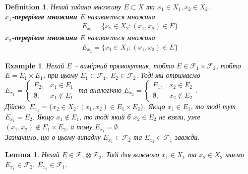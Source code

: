 \documentclass[a4paper, 10pt]{article}
\theoremstyle{theoremdd}
\newtheorem{definition}[theorem]{Definition}
\newtheorem{example}[theorem]{Example}
\newtheorem{lemma}[theorem]{Lemma}
\begin{document}
\begin{definition}
Нехай задано множину $E \subset X$ та $x_1 \in X_1, x_2 \in X_2$.\\
\textbf{$x_1$-перерізом множини $E$} називається множина
\begin{align*}
E_{x_1} = \{x_2 \in X_2 : (x_1,x_2) \in E\}
\end{align*}
\textbf{$x_2$-перерізом множини $E$} називається множина
\begin{align*}
E_{x_2} = \{x_1 \in X_1 : (x_1,x_2) \in E\}
\end{align*}
\end{definition}

\begin{example}
\label{measurable_rectangle_and_its_sections}
Нехай $E$ -- вимірний прямокутник, тобто $E \in \mathcal{F}_1 \times \mathcal{F}_2$, тобто $E = E_1 \times E_1$, при цьому $E_1 \in \mathcal{F}_1,\ E_2 \in \mathcal{F}_2$. Тоді ми отримаємо $E_{x_1} = \begin{cases} E_2, & x_1 \in E_1 \\ \emptyset, & x_1 \notin E_1 \end{cases}$ та аналогічно $E_{x_2} = \begin{cases} E_1, & x_2 \in E_2 \\ \emptyset, & x_2 \notin E_2 \end{cases}$.\\
Дійсно, $E_{x_1} = \{x_2 \in X_2 : (x_1,x_2) \in E_1 \times E_2\}$. Якщо $x_1 \in E_1$, то тоді тут $E_{x_1} = E_2$. Якщо $x_1 \notin E_1$, то тоді який б $x_2 \in E_2$ не взяли, уже $(x_1,x_2) \notin E_1 \times E_2$, а тому $E_{x_1} = \emptyset$.\\
Зазначимо, що в цьому випадку $E_{x_1} \in \mathcal{F}_2$ та $E_{x_2} \in \mathcal{F}_1$ завжди.
\end{example}

\begin{lemma}
Нехай $E \in \mathcal{F}_1 \otimes \mathcal{F}_2$. Тоді для кожного $x_1 \in X_1$ та $x_2 \in X_2$ маємо $E_{x_1} \in \mathcal{F}_2,\ E_{x_2} \in \mathcal{F}_1$.
\end{lemma}
\end{document}
